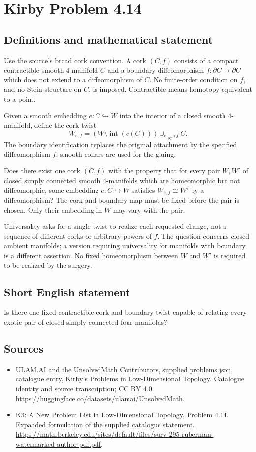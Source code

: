 \documentclass[11pt,a4paper]{article}
\begin{document}
\section*{Kirby Problem 4.14}\label{statement}

\subsection{Definitions and mathematical statement}
Use the source's broad cork convention. A cork $(C,f)$ consists of a
compact contractible smooth $4$-manifold $C$ and a boundary
diffeomorphism $f:\partial C\to\partial C$ which does not extend to
a diffeomorphism of $C$. No finite-order condition on $f$, and no
Stein structure on $C$, is imposed. Contractible means homotopy
equivalent to a point.

Given a smooth embedding $e:C\hookrightarrow W$ into the interior
of a closed smooth $4$-manifold, define the cork twist
\[
 W_{e,f}=(W\setminus\operatorname{int}(e(C)))\cup_{e|_{\partial C}\circ f}C.
\]
The boundary identification replaces the original attachment by the
specified diffeomorphism $f$; smooth collars are used for the gluing.

Does there exist one cork $(C,f)$ with the property that for every
pair $W,W'$ of closed simply connected smooth $4$-manifolds which
are homeomorphic but not diffeomorphic, some embedding $e:C\hookrightarrow W$
satisfies $W_{e,f}\cong W'$ by a diffeomorphism?
The cork and boundary map must be fixed before the pair is chosen.
Only their embedding in $W$ may vary with the pair.

Universality asks for a single twist to realize each requested change,
not a sequence of different corks or arbitrary powers of $f$.
The question concerns closed ambient manifolds; a version requiring
universality for manifolds with boundary is a different assertion.
No fixed homeomorphism between $W$ and $W'$ is required to be
realized by the surgery.
\subsection{Short English statement}
Is there one fixed contractible cork and boundary twist capable of relating every exotic pair of closed simply connected four-manifolds?
\subsection{Sources}
\begin{itemize}
\item[S1] ULAM.AI and the UnsolvedMath Contributors, supplied problems.json, catalogue entry, Kirby's Problems in Low-Dimensional Topology. Catalogue identity and source transcription; CC BY 4.0.
\url{https://huggingface.co/datasets/ulamai/UnsolvedMath}.
\item[S2] K3: A New Problem List in Low-Dimensional Topology, Problem 4.14. Expanded formulation of the supplied catalogue statement.
\url{https://math.berkeley.edu/sites/default/files/surv-295-ruberman-watermarked-author-pdf.pdf}.
\end{itemize}
\end{document}
